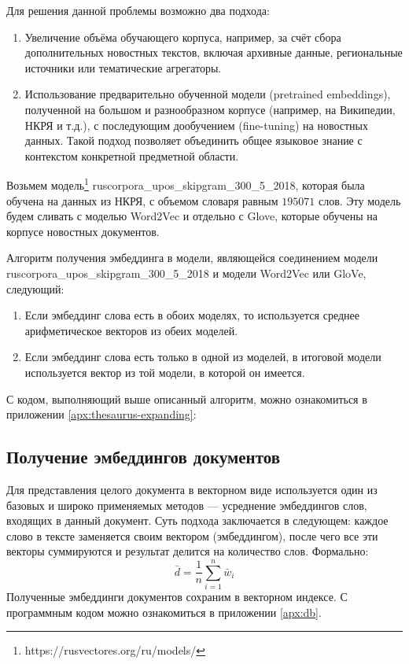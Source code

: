 \documentclass[coursework]{SCWorks}
\begin{document}
Для решения данной проблемы возможно два подхода:
\begin{enumerate}
    \item Увеличение объёма обучающего корпуса, например, за счёт сбора дополнительных новостных текстов, включая архивные данные, региональные источники или тематические агрегаторы.
    
    \item Использование предварительно обученной модели (pretrained embeddings), полученной на большом и разнообразном корпусе (например, на Википедии, НКРЯ и т.д.), с последующим дообучением (fine-tuning) на новостных данных. Такой подход позволяет объединить общее языковое знание с контекстом конкретной предметной области.
\end{enumerate}
    
Возьмем модель\footnote{https://rusvectores.org/ru/models/} ruscorpora\_upos\_skipgram\_300\_5\_2018, которая была обучена на данных из НКРЯ, с объемом словаря равным $195 071$ слов. Эту модель будем сливать с моделью Word2Vec и отдельно с Glove, которые обучены на корпусе новостных документов.

Алгоритм получения эмбеддинга в модели, являющейся соединением модели ruscorpora\_upos\_skipgram\_300\_5\_2018 и модели Word2Vec или GloVe, следующий:
\begin{enumerate}
    \item Если эмбеддинг слова есть в обоих моделях, то используется среднее арифметическое векторов из обеих моделей.
    \item Если эмбеддинг слова есть только в одной из моделей, в итоговой модели используется вектор из той модели, в которой он имеется.
\end{enumerate}

С кодом, выполняющий выше описанный алгоритм, можно ознакомиться в приложении \ref{apx:thesaurus-expanding}:

\subsection{Получение эмбеддингов документов}
Для представления целого документа в векторном виде используется один из базовых и широко применяемых методов — усреднение эмбеддингов слов, входящих в данный документ. Суть подхода заключается в следующем: каждое слово в тексте заменяется своим вектором (эмбеддингом), после чего все эти векторы суммируются и результат делится на количество слов. Формально:
$$
    \bar{d} = \frac{1}{n} \sum_{i = 1}^n \bar{w}_i
$$
Полученные эмбеддинги документов сохраним в векторном индексе. С программным кодом можно ознакомиться в приложении \ref{apx:db}.
\end{document}
